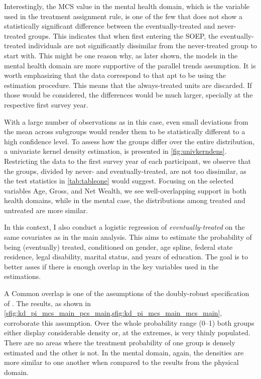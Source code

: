 Interestingly, the MCS value in the mental health domain, which is the variable used in the treatment assignment
rule, is one of the few that does not show a statistically significant difference between the eventually-treated
and never-treated groups. This indicates that when first entering the SOEP, the eventually-treated individuals are
not significantly dissimilar from the never-treated group to start with. This might be one reason why, as later
shown, the models in the mental health domain are more supportive of the parallel trends assumption. It is worth
emphasizing that the data correspond to that apt to be using the estimation procedure. This means that the
always-treated units are discarded. If those would be considered, the differences would be much larger, specially
at the respective first survey year.


With a large number of observations as in this case, even small deviations from the mean across subgroups would
render them to be statistically different to a high confidence level. To assess how the groups differ over the
entire distribution, a univariate kernel density estimation, is presented in \cref{fig:univkerndens}. Restricting
the data to the first survey year of each participant, we observe that the groups, divided by never- and
eventually-treated, are not too dissimilar, as the test statistics in \cref{tab:tableone} would suggest. Focusing
on the selected variables Age, Gross, and Net Wealth, we see well-overlapping support in both health domains, while
in the mental case, the distributions among treated and untreated are more similar.

In this context, I also conduct a logistic regression of \textit{eventually-treated} on the same covariates as in
the main analysis. This aims to estimate the probability of being (eventually) treated, conditioned on  gender, age
spline, federal state residence, legal disability, marital status, and years of education.  The goal is to better
asses if there is enough overlap in the key variables used in the estimations. 

A Common overlap is one of the assumptions of the doubly-robust specification of \textcite[see Assumption 6,
``Overlap condition'']{cs2021did_mtp}. The results, as shown in
\cref{sfig:kd_pi_mcs_main_pcs_main,sfig:kd_pi_mcs_main_mcs_main}, corroborate this assumption. Over the whole
probability range (0--1)  both groups either display considerable density or, at the extremes, is very thinly
populated. There are no areas where the treatment probability of one group is densely estimated and the other is
not. In the mental domain, again, the densities are more similar to one another when compared to the results
from the physical domain.

